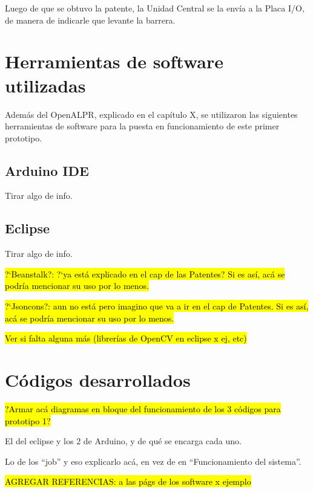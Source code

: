 Luego de que se obtuvo la patente, la Unidad Central se la envía a la Placa I/O, de manera de indicarle que levante la barrera.

\section{Herramientas de software utilizadas}\label{sec:herrSoft}

Además del OpenALPR, explicado en el \textcolor{mGreen}{capítulo X}, se utilizaron las siguientes herramientas de software para la puesta en funcionamiento de este primer prototipo.

\subsection{Arduino IDE}

Tirar algo de info.

\subsection{Eclipse}

Tirar algo de info.


\hl{?`Beanstalk?: ?`ya est\'a explicado en el cap de las Patentes? Si es as\'i, ac\'a se podr\'ia mencionar su uso por lo menos.}

\hl{?`Jsoncons?: aun no est\'a pero imagino que va a ir en el cap de Patentes. Si es as\'i, ac\'a se podr\'ia mencionar su uso por lo menos.}

\hl{Ver si falta alguna m\'as (librer\'ias de OpenCV en eclipse x ej, etc)}

\section{Códigos desarrollados}\label{sec:codDes}

\hl{?Armar ac\'a diagramas en bloque del funcionamiento de los 3 c\'odigos para prototipo 1?}

El del eclipse y los 2 de Arduino, y de qué se encarga cada uno.

Lo de los “job” y eso explicarlo acá, en vez de en “Funcionamiento del sistema”.

\hl{AGREGAR REFERENCIAS: a las p\'ags de los software x ejemplo}

